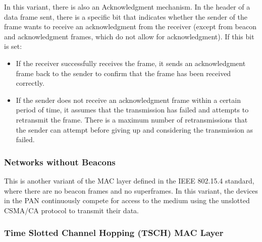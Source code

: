 In this variant, there is also an Acknowledgment mechanism. In the header of a data frame sent, there is a specific bit that indicates whether the sender of the frame wants to receive an acknowledgment from the receiver (except from beacon and acknowledgment frames, which do not allow for acknowledgment). If this bit is set:
\begin{itemize}
    \item If the receiver successfully receives the frame, it sends an acknowledgment frame back to the sender to confirm that the frame has been received correctly.
    \item If the sender does not receive an acknowledgment frame within a certain period of time, it assumes that the transmission has failed and attempts to retransmit the frame. There is a maximum number of retransmissions that the sender can attempt before giving up and considering the transmission as failed.
\end{itemize}


\subsubsection{Networks without Beacons}

This is another variant of the MAC layer defined in the IEEE 802.15.4 standard, where there are no beacon frames and no superframes. In this variant, the devices in the PAN continuously compete for access to the medium using the unslotted CSMA/CA protocol to transmit their data.



\subsubsection{Time Slotted Channel Hopping (TSCH) MAC Layer}

